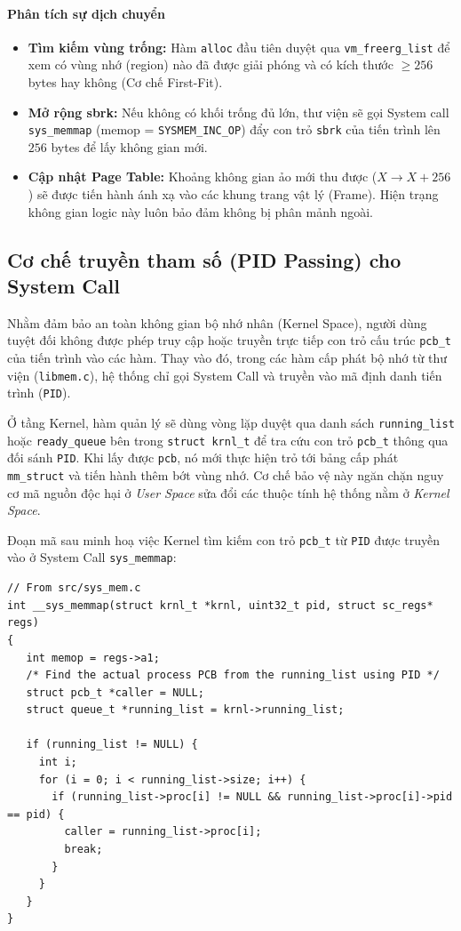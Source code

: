 \documentclass[a4paper]{article}
\begin{document}
\paragraph{Phân tích sự dịch chuyển}
\begin{itemize}
    \item \textbf{Tìm kiếm vùng trống:} Hàm \texttt{alloc} đầu tiên duyệt qua \texttt{vm\_freerg\_list} để xem có vùng nhớ (region) nào đã được giải phóng và có kích thước $\ge 256$ bytes hay không (Cơ chế First-Fit).
    \item \textbf{Mở rộng sbrk:} Nếu không có khối trống đủ lớn, thư viện sẽ gọi System call \texttt{sys\_memmap} (memop = \texttt{SYSMEM\_INC\_OP}) đẩy con trỏ \texttt{sbrk} của tiến trình lên $256$ bytes để lấy không gian mới.
    \item \textbf{Cập nhật Page Table:} Khoảng không gian ảo mới thu được ($X \rightarrow X + 256$) sẽ được tiến hành ánh xạ vào các khung trang vật lý (Frame). Hiện trạng không gian logic này luôn bảo đảm không bị phân mảnh ngoài.
\end{itemize}

\subsection{Cơ chế truyền tham số (PID Passing) cho System Call}

Nhằm đảm bảo an toàn không gian bộ nhớ nhân (Kernel Space), người dùng tuyệt đối không được phép truy cập hoặc truyền trực tiếp con trỏ cấu trúc \texttt{pcb\_t} của tiến trình vào các hàm. Thay vào đó, trong các hàm cấp phát bộ nhớ từ thư viện (\texttt{libmem.c}), hệ thống chỉ gọi System Call và truyền vào mã định danh tiến trình (\texttt{PID}).

Ở tầng Kernel, hàm quản lý sẽ dùng vòng lặp duyệt qua danh sách \texttt{running\_list} hoặc \texttt{ready\_queue} bên trong \texttt{struct krnl\_t} để tra cứu con trỏ \texttt{pcb\_t} thông qua đối sánh \texttt{PID}. Khi lấy được \texttt{pcb}, nó mới thực hiện trỏ tới bảng cấp phát \texttt{mm\_struct} và tiến hành thêm bớt vùng nhớ. Cơ chế bảo vệ này ngăn chặn nguy cơ mã nguồn độc hại ở \textit{User Space} sửa đổi các thuộc tính hệ thống nằm ở \textit{Kernel Space}.

Đoạn mã sau minh hoạ việc Kernel tìm kiếm con trỏ \texttt{pcb\_t} từ \texttt{PID} được truyền vào ở System Call \texttt{sys\_memmap}:
\begin{verbatim}
// From src/sys_mem.c
int __sys_memmap(struct krnl_t *krnl, uint32_t pid, struct sc_regs* regs)
{
   int memop = regs->a1;
   /* Find the actual process PCB from the running_list using PID */
   struct pcb_t *caller = NULL;
   struct queue_t *running_list = krnl->running_list;
   
   if (running_list != NULL) {
     int i;
     for (i = 0; i < running_list->size; i++) {
       if (running_list->proc[i] != NULL && running_list->proc[i]->pid == pid) {
         caller = running_list->proc[i];
         break;
       }
     }
   }
}
\end{verbatim}
\end{document}
